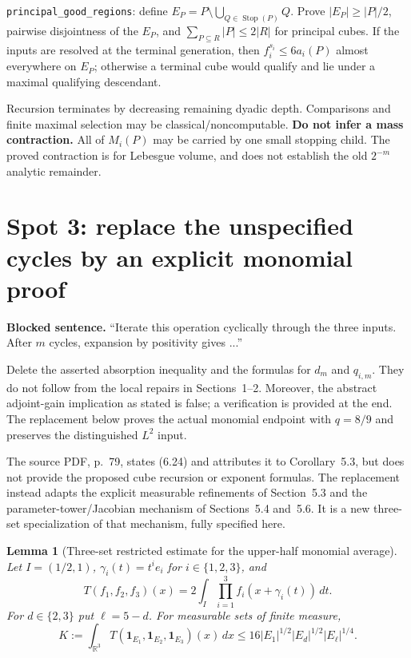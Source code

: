 \documentclass[11pt]{article}
\newtheorem{lemma}{Lemma}[section]
\begin{document}
\texttt{principal\_good\_regions}: define
$E_P=P\setminus\bigcup_{Q\in\operatorname{Stop}(P)}Q$.
Prove $|E_P|\geq|P|/2$, pairwise disjointness of the $E_P$, and
$\sum_{P\subseteq R}|P|\leq2|R|$ for principal cubes. If the inputs are
resolved at the terminal generation, then
$f_i^{s_i}\leq6a_i(P)$ almost everywhere on $E_P$; otherwise a terminal
cube would qualify and lie under a maximal qualifying descendant.

Recursion terminates by decreasing remaining dyadic depth. Comparisons
and finite maximal selection may be classical/noncomputable.
\textbf{Do not infer a mass contraction.} All of $M_i(P)$ may be carried
by one small stopping child. The proved contraction is for Lebesgue
volume, and does not establish the old $2^{-m}$ analytic remainder.

\section{Spot 3: replace the unspecified cycles by an explicit monomial proof}
\textbf{Blocked sentence.} ``Iterate this operation cyclically through the
three inputs. After $m$ cycles, expansion by positivity gives ...''

Delete the asserted absorption inequality and the formulas for $d_m$ and
$q_{i,m}$. They do not follow from the local repairs in Sections~1--2.
Moreover, the abstract adjoint-gain implication as stated is false; a
verification is provided at the end. The replacement below proves the
actual monomial endpoint with $q=8/9$ and preserves the distinguished
$L^2$ input.

The source PDF, p.~79, states (6.24) and attributes it to Corollary~5.3,
but does not provide the proposed cube recursion or exponent formulas.
The replacement instead adapts the explicit measurable refinements of
Section~5.3 and the parameter-tower/Jacobian mechanism of Sections~5.4
and~5.6. It is a new three-set specialization of that mechanism, fully
specified here.


\begin{lemma}[Three-set restricted estimate for the upper-half monomial average]
\label{lem:three-set-restricted-upper-half}
Let $I=(1/2,1)$, $\gamma_i(t)=t^i e_i$ for $i\in\{1,2,3\}$, and
\[
 T(f_1,f_2,f_3)(x)=2\int_I\prod_{i=1}^3 f_i(x+\gamma_i(t))\,dt.
\]
For $d\in\{2,3\}$ put $\ell=5-d$. For measurable sets of finite measure,
\[
 K:=\int_{\mathbb R^3}T(\mathbf1_{E_1},\mathbf1_{E_2},\mathbf1_{E_3})(x)\,dx
 \leq 16|E_1|^{1/2}|E_d|^{1/2}|E_\ell|^{1/4}.
 \tag{R}
\]
\end{lemma}
\end{document}
